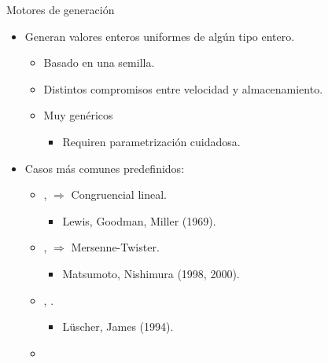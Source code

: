 \begin{frame}[t]{Motores de generación}
\begin{itemize}
  \item Generan valores enteros uniformes de algún tipo entero.
    \begin{itemize}
      \item Basado en una semilla.
      \item Distintos compromisos entre velocidad y almacenamiento.
      \item Muy genéricos
        \begin{itemize}
          \item Requiren parametrización cuidadosa.
        \end{itemize}
    \end{itemize}
  \vfill\pause
  \item Casos más comunes predefinidos:
    \begin{itemize}
      \item {},  $\Rightarrow$ Congruencial lineal.
        \begin{itemize}
          \item Lewis, Goodman, Miller (1969).
        \end{itemize}
      \item {},  $\Rightarrow$ Mersenne-Twister.
        \begin{itemize}
          \item Matsumoto, Nishimura (1998, 2000).
        \end{itemize}
      \item {}, .
        \begin{itemize}
          \item L\"{u}scher, James (1994).
        \end{itemize}
      \item {}
    \end{itemize}
\end{itemize}
\end{frame}

